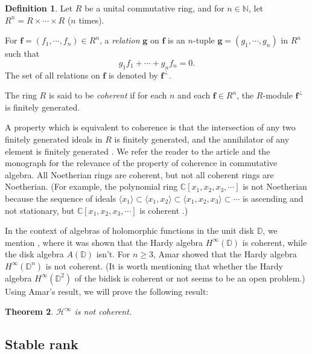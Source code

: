 \documentclass[11pt,reqno]{amsart}
\numberwithin{equation}{section}
\newtheorem{theorem}{Theorem}[section]
\theoremstyle{definition}
\theoremstyle{definition}
\newtheorem{definition}[theorem]{Definition}
\theoremstyle{definition}
\begin{document}
\begin{definition}
Let $R$ be a unital commutative ring, and for $n\in {\mathbb{N}}$, let $R^n=R\times \cdots\times R$ ($n$ times). 

\noindent For $\mathbf{f}=(f_1,\cdots, f_n)\in R^n$, a {\em relation} 
$\mathbf{g}$ on $\mathbf{f}$ is an $n$-tuple $\mathbf{g}=(g_1,\cdots, g_n)$ in $R^n$ such that
$$
g_1 f_1+\cdots + g_n f_n=0.
$$
The set of all relations on $\mathbf{f}$ is denoted by  $\mathbf{f}^\perp$. 

\noindent The ring $R$ is said to be {\em coherent} if for each $n$ and each
$\mathbf{f}\in R^n$, the $R$-module $\mathbf{f}^\perp$ is finitely generated.
\end{definition}

A property which is equivalent to coherence is that
the intersection of any two finitely generated ideals in $R$ is
finitely generated, and the annihilator of any element is finitely
generated \cite{Cha}. We refer the reader to the article \cite{Gla} and the monograph
\cite{Gla2} for the relevance of the property of coherence in
commutative algebra. All Noetherian rings are coherent, but
not all coherent rings are Noetherian. (For example, the polynomial
ring ${\mathbb{C}}[x_1, x_2, x_3,\cdots ]$ is not Noetherian because the
sequence of ideals $\langle x_1 \rangle \subset \langle x_1,
x_2\rangle \subset \langle x_1, x_2, x_3\rangle \subset \cdots$ is
ascending and not stationary, but ${\mathbb{C}}[x_1, x_2, x_3,\cdots ]$ is
coherent \cite[Corollary~2.3.4]{Gla2}.)

In the context of algebras of holomorphic functions in the unit disk
${\mathbb{D}}$, we mention \cite{McVRub}, where it was shown that the
Hardy algebra $H^\infty({\mathbb{D}})$ is coherent, while the disk algebra
$A({\mathbb{D}})$ isn't.  For $n\geq 3$, Amar \cite{Ama} showed that the Hardy
algebra $H^\infty ({\mathbb{D}}^n)$ is not coherent. (It is worth mentioning that whether
the Hardy algebra $H^\infty({\mathbb{D}}^2)$ of the bidisk is coherent or not
seems to be an open problem.)  Using Amar's result, we will prove the
following result:

\begin{theorem}
\label{main_theorem}
 ${{{\mathscr{H}}^{\infty}}}$ is not coherent.
\end{theorem}

\subsection{Stable rank}
\end{document}
